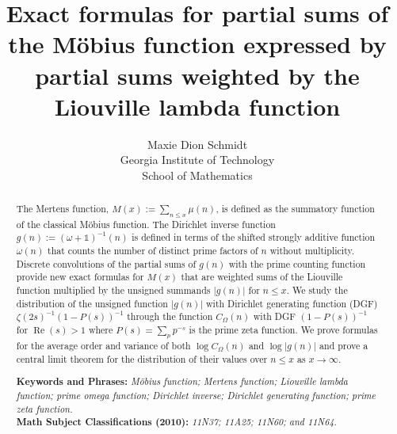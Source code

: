 \documentclass[11pt,reqno,a4letter]{article}
\title{
       Exact formulas for partial sums of the M\"obius function expressed by 
       partial sums weighted by the Liouville lambda function
}
\author{Maxie Dion Schmidt \\
        Georgia Institute of Technology \\
        School of Mathematics
}
\numberwithin{equation}{section}
\numberwithin{figure}{section}
\numberwithin{table}{section}
\theoremstyle{plain}
\numberwithin{theorem}{section}
\theoremstyle{definition}
\renewcommand{\Re}{\operatorname{Re}}
\begin{document}
 

\maketitle

\begin{abstract} 
\noindent  
The Mertens function, $M(x) := \sum_{n \leq x} \mu(n)$, is 
defined as the summatory function of the classical M\"obius function.
The Dirichlet inverse function $g(n) := (\omega+\mathds{1})^{-1}(n)$
is defined in terms of the shifted strongly additive function $\omega(n)$ that counts the 
number of distinct prime factors of $n$ without multiplicity. 
Discrete convolutions of the partial sums of $g(n)$ with the prime counting function 
provide new exact formulas for $M(x)$ that are weighted sums of the Liouville function 
multiplied by the unsigned summands $|g(n)|$ for $n \leq x$. 
We study the distribution of the unsigned function $|g(n)|$ with 
Dirichlet generating function (DGF) $\zeta(2s)^{-1}(1-P(s))^{-1}$ 
through the function $C_{\Omega}(n)$ with DGF 
$(1-P(s))^{-1}$ for $\Re(s) > 1$ where $P(s) = \sum_p p^{-s}$ is the 
prime zeta function. 
We prove formulas for the average order and variance of both 
$\log C_{\Omega}(n)$ and $\log |g(n)|$ and prove a central limit theorem 
for the distribution of their values over $n \leq x$ as $x \rightarrow \infty$. 

\bigskip\noindent
\textbf{Keywords and Phrases:} {\it M\"obius function; Mertens function; 
                                    Liouville lambda function; prime omega function; 
                                    Dirichlet inverse; Dirichlet generating function; 
				    prime zeta function. } \\[0.05cm] 
\textbf{Math Subject Classifications (2010):} {\it 11N37; 11A25; 11N60; and 11N64. } 
\end{abstract} 

\end{document}
